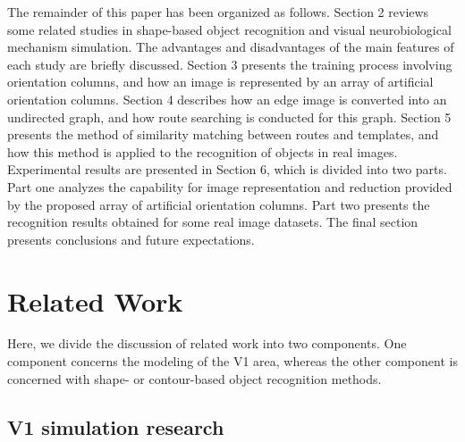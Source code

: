 \documentclass[journal]{IEEEtran}
\begin{document}
The remainder of this paper has been organized as follows. 
Section 2 reviews some related studies in shape-based object recognition and visual neurobiological mechanism simulation. 
The advantages and disadvantages of the main features of each study are briefly discussed. 
Section 3 presents the training process involving orientation columns, 
and how an image is represented by an array of artificial orientation columns. 
Section 4 describes how an edge image is converted into an undirected graph, 
and how route searching is conducted for this graph. 
Section 5 presents the method of similarity matching between routes and templates, 
and how this method is applied to the recognition of objects in real images. 
Experimental results are presented in Section 6, which is divided into two parts. 
Part one analyzes the capability for image representation and reduction provided by the proposed array of artificial orientation columns. 
Part two presents the recognition results obtained for some real image datasets. 
The final section presents conclusions and future expectations.

\section{Related Work}

Here, we divide the discussion of related work into two components. 
One component concerns the modeling of the V1 area, 
whereas the other component is concerned with shape- or contour-based object recognition methods. 

\subsection{V1 simulation research}
\end{document}
